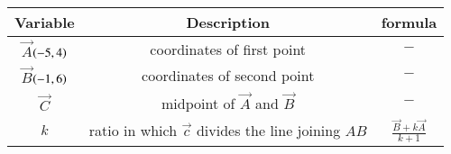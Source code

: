 \begin{tabular}[12pt]{ |c| c|c|}
    \hline
        \textbf{Variable}  & \textbf{Description} & \textbf{formula}\\
    \hline
        $\vec{A}$$\left(-5,4\right)$ &  coordinates of first point & $-$ \\
    \hline 
        $\vec{B}$$\left(-1,6\right)$ & coordinates of second point & $-$\\
    \hline
        $\vec{C}$& midpoint of $\vec{A}$ and $\vec{B}$ & $-$\\ 
    \hline
        $k$ & ratio in which $\vec{c}$ divides the line joining $AB$ & $\frac{\vec{B}+k\vec{A}}{k+1}$\\
    \hline       
\end{tabular}
